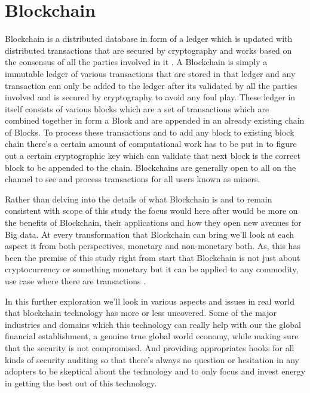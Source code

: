 \section{Blockchain}
Blockchain is a distributed database in form of a ledger which is updated with distributed transactions that are secured by cryptography and works based on the consensus of all the parties involved in it \cite{beck13}. A Blockchain is simply a immutable ledger of various transactions that are stored in that ledger and any transaction can only be added to the ledger after its validated by all the parties involved and is secured by cryptography to avoid any foul play. These ledger in itself consists of various blocks which are a set of transactions which are combined together in form a Block and are appended in an already existing chain of Blocks. To process these transactions and to add any block to existing block chain there's a certain amount of computational work has to be put in to figure out a certain cryptographic key which can validate that next block is the correct block to be appended to the chain. Blockchains are generally open to all on the channel to see and process transactions for all users known as miners.

Rather than delving into the details of what Blockchain is and to remain consistent with scope of this study the focus would here after would be more on the benefits of Blockchain, their applications and how they open new avenues for Big data. At every transformation that Blockchain can bring we'll look at each aspect it from both perspectives, monetary and non-monetary both. As, this has been the premise of this study right from start that Blockchain is not just about cryptocurrency or something monetary but it can be applied to any commodity, use case where there are transactions \cite{beck13}.

In this further exploration we'll look in various aspects and issues in real world that blockchain technology has more or less uncovered. Some of the major industries and domains which this technology can really help with our the global financial establishment, a genuine true global world economy, while making sure that the security is not compromised. And providing appropriates hooks for all kinds of security auditing so that there's always no question or hesitation in any adopters to be skeptical about the technology and to only focus and invest energy in getting the best out of this technology.

